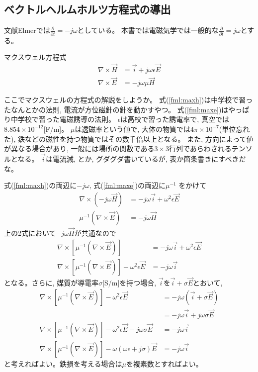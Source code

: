 \subsection{ベクトルヘルムホルツ方程式の導出}

文献Elmerでは$\frac{\partial}{\partial t}=-j\omega$としている。
本書では電磁気学では一般的な$\frac{\partial}{\partial t}=j\omega$とする。

マクスウェル方程式
\begin{align}
\nabla\times\vec{H}&=\vec{i}+j\omega\epsilon\vec{E}\label{fml:maxh}\\
\nabla\times\vec{E}&=-j\omega\mu\vec{H}\label{fml:maxe}
\end{align}

ここでマクスウェルの方程式の解説をしようか。
式(\ref{fml:maxh})は中学校で習ったなんとかの法則,
電流が方位磁針の針を動かすやつ。
式(\ref{fml:maxe})はやっぱり中学校で習った電磁誘導の法則。
$\epsilon$は高校で習った誘電率で,
真空では$8.854\times10^{-12}$[F/m]。
$\mu$は透磁率という値で,
大体の物質では$4\pi\times10^{-7}$(単位忘れた),
鉄などの磁性を持つ物質ではその数千倍以上となる。
また, 方向によって値が異なる場合があり,
一般には場所の関数である$3\times3$行列であらわされるテンソルとなる。
$\vec{i}$は電流減, とか, グダグダ書いているが, 表か箇条書きにすべきだな。

式(\ref{fml:maxh})の両辺に$-j\omega$,
式(\ref{fml:maxe})の両辺に$\mu^{-1}$ をかけて
\begin{align}
\nabla\times\left(-j\omega\vec{H}\right)
&=-j\omega\vec{i}+\omega^2\epsilon\vec{E}\\
\mu^{-1}\left(\nabla\times\vec{E}\right)
&=-j\omega\vec{H}
\end{align}
上の2式において$-j\omega\vec{H}$が共通なので
\begin{align}
\nabla\times\left[
\mu^{-1}\left(\nabla\times\vec{E}\right)
\right]
&=-j\omega\vec{i}+\omega^2\epsilon\vec{E}\\
\nabla\times\left[
\mu^{-1}\left(\nabla\times\vec{E}\right)
\right]-\omega^2\epsilon\vec{E}
&=-j\omega\vec{i}
\end{align}
となる。さらに, 媒質が導電率$\sigma$[S/m]を持つ場合,
$\vec{i}$を$\vec{i}+\sigma\vec{E}$とおいて,
\begin{align}
\nabla\times\left[
\mu^{-1}\left(\nabla\times\vec{E}\right)
\right]-\omega^2\epsilon\vec{E}
&=-j\omega\left(\vec{i}+\sigma\vec{E}\right)\\
&=-j\omega\vec{i}+j\omega\sigma\vec{E}\\
\nabla\times\left[
\mu^{-1}\left(\nabla\times\vec{E}\right)
\right]-\omega^2\epsilon\vec{E}-j\omega\sigma\vec{E}
&=-j\omega\vec{i}\\
\nabla\times\left[
\mu^{-1}\left(\nabla\times\vec{E}\right)
\right]-\omega\left(\omega\epsilon+j\sigma\right)\vec{E}
&=-j\omega\vec{i}
\end{align}
と考えればよい。鉄損を考える場合は$\mu$を複素数とすればよい。

